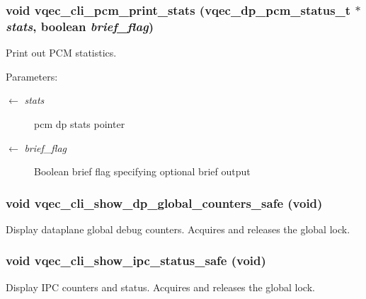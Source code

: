 \subsubsection{\setlength{\rightskip}{0pt plus 5cm}void vqec\_\-cli\_\-pcm\_\-print\_\-stats (vqec\_\-dp\_\-pcm\_\-status\_\-t $\ast$ {\em stats}, boolean {\em brief\_\-flag})}\label{vqec__cli__interface_8c_00db3e3d93ee990978e268f395e901bb}


Print out PCM statistics.

\begin{Desc}
\item[Parameters:]
\begin{description}
\item[\mbox{$\leftarrow$} {\em stats}]pcm dp stats pointer \item[\mbox{$\leftarrow$} {\em brief\_\-flag}]Boolean brief flag specifying optional brief output \end{description}
\end{Desc}
\subsubsection{\setlength{\rightskip}{0pt plus 5cm}void vqec\_\-cli\_\-show\_\-dp\_\-global\_\-counters\_\-safe (void)}\label{vqec__cli__interface_8c_20623cdf496f43bdc2f7789160b6d963}


Display dataplane global debug counters. Acquires and releases the global lock. 
\subsubsection{\setlength{\rightskip}{0pt plus 5cm}void vqec\_\-cli\_\-show\_\-ipc\_\-status\_\-safe (void)}\label{vqec__cli__interface_8c_184dc0b61298ff79166787102f525dd8}


Display IPC counters and status. Acquires and releases the global lock. 